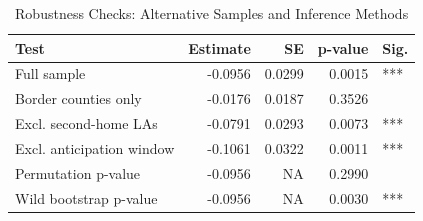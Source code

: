 \begin{table}[!h]
\centering
\caption{\label{tab:tab:robustness}Robustness Checks: Alternative Samples and Inference Methods}
\centering
\begin{tabular}[t]{lrrrl}
\toprule
Test & Estimate & SE & p-value & Sig.\\
\midrule
Full sample & -0.0956 & 0.0299 & 0.0015 & ***\\
Border counties only & -0.0176 & 0.0187 & 0.3526 & \\
Excl. second-home LAs & -0.0791 & 0.0293 & 0.0073 & ***\\
Excl. anticipation window & -0.1061 & 0.0322 & 0.0011 & ***\\
Permutation p-value & -0.0956 & NA & 0.2990 & \\
\addlinespace
Wild bootstrap p-value & -0.0956 & NA & 0.0030 & ***\\
\bottomrule
\end{tabular}
\end{table}

